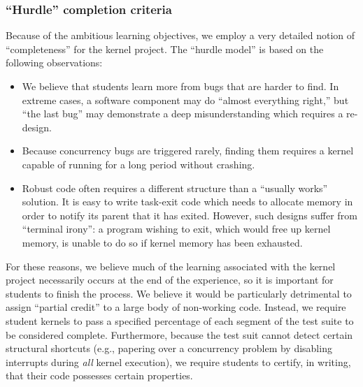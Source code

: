 \subsubsection{``Hurdle'' completion criteria}

Because of the ambitious learning objectives,
we employ a very detailed notion of ``completeness''
for the kernel project.
The ``hurdle model'' is based on the following observations:

\begin{itemize}

\item We believe that students learn more from bugs
that are harder to find.
In extreme cases, a software component may do
``almost everything right,'' but ``the last bug'' may
demonstrate a deep misunderstanding which requires a re-design.

\item Because concurrency bugs are triggered rarely,
finding them requires a kernel capable of running
for a long period without crashing.

\item Robust code often requires a different structure
than a ``usually works'' solution.
It is easy to write task-exit code which
needs to allocate memory in order to notify its
parent that it has exited.
However, such designs suffer from ``terminal irony'':
a program wishing to exit,
which would free up kernel memory,
is unable to do so if kernel memory has been exhausted.

\end{itemize}

For these reasons, we believe much of the learning
associated with the kernel project necessarily occurs
at the end of the experience,
so it is important for students to finish the process.
We believe it would be particularly detrimental to
assign ``partial credit'' to a large body of non-working
code.
Instead, we require student kernels to pass a
specified percentage of each segment of the test
suite to be considered complete.
Furthermore,
because the test suit cannot detect certain
structural shortcuts (e.g., papering over a concurrency
problem by disabling interrupts during \textit{all}
kernel execution),
we require students to certify, in writing, that
their code possesses certain properties.

